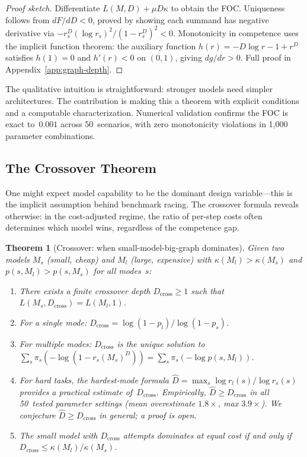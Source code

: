 \documentclass[twoside,11pt]{article}
\newtheorem{theorem}{Theorem}
\newcommand{\Dcross}{D_{\mathrm{cross}}}
\newcommand{\appref}[1]{Appendix~\ref{#1}}
\begin{document}
\begin{proof}[Proof sketch]
Differentiate $L(M,D) + \mu D \kappa$ to obtain the FOC.
Uniqueness follows from $dF/dD < 0$, proved by showing each summand has negative derivative via $-r_s^D (\log r_s)^2 / (1-r_s^D)^2 < 0$.
Monotonicity in competence uses the implicit function theorem: the auxiliary function $h(r) = -D\log r - 1 + r^D$ satisfies $h(1) = 0$ and $h'(r) < 0$ on $(0,1)$, giving $dg/dr > 0$.
Full proof in \appref{app:graph-depth}.
\end{proof}

The qualitative intuition is straightforward: stronger models need simpler architectures.
The contribution is making this a theorem with explicit conditions and a computable characterization.
Numerical validation confirms the FOC is exact to~$0.001$ across 50~scenarios, with zero monotonicity violations in 1{,}000 parameter combinations.

\subsection{The Crossover Theorem}
\label{sec:crossover}

One might expect model capability to be the dominant design variable---this is the implicit assumption behind benchmark racing.
The crossover formula reveals otherwise: in the cost-adjusted regime, the ratio of per-step costs often determines which model wins, regardless of the competence gap.

\begin{theorem}[Crossover: when small-model-big-graph dominates]
\label{thm:crossover}
Given two models $M_s$ (small, cheap) and $M_l$ (large, expensive) with $\kappa(M_l) > \kappa(M_s)$ and $p(s, M_l) > p(s, M_s)$ for all modes~$s$:
\begin{enumerate}[label=(\alph*)]
  \item There exists a finite crossover depth $\Dcross \ge 1$ such that $L(M_s, \Dcross) = L(M_l, 1)$.
  \item For a single mode: $\Dcross = \log(1 - p_l) / \log(1 - p_s)$.
  \item For multiple modes: $\Dcross$ is the unique solution to $\sum_s \pi_s (-\log(1 - r_s(M_s)^D)) = \sum_s \pi_s (-\log p(s, M_l))$.
  \item For hard tasks, the hardest-mode formula $\hat{D} = \max_s \log r_l(s) / \log r_s(s)$ provides a practical estimate of~$\Dcross$. Empirically, $\hat{D} \ge \Dcross$ in all 50~tested parameter settings (mean overestimate $1.8\times$, max $3.9\times$). We conjecture $\hat{D} \ge \Dcross$ in general; a proof is open.
  \item The small model with $\Dcross$ attempts dominates at equal cost if and only if $\Dcross \le \kappa(M_l) / \kappa(M_s)$.
\end{enumerate}
\end{theorem}
\end{document}
